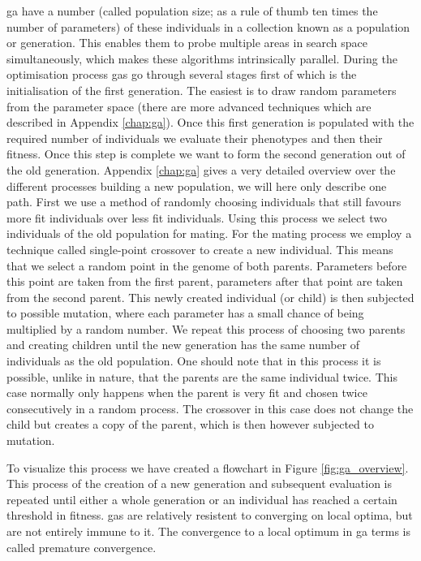 \gls{ga} have a number (called population size; as a rule of thumb ten times the number of parameters) of these \glspl{individual} in a collection known as a population or generation. This enables them to probe multiple areas in search space simultaneously, which makes these algorithms intrinsically parallel. During the optimisation process \glspl{ga} go through several stages first of which is the initialisation of the first generation. The easiest is to draw random parameters from the parameter space (there are more advanced techniques which are described in Appendix \ref{chap:ga}). Once this first generation is populated with the required number of \glspl{individual} we evaluate their \glspl{phenotype} and then their \gls{fitness}. Once this step is complete we want to form the second generation out of the old generation. Appendix \ref{chap:ga} gives a very detailed overview over the different processes building a new population, we will here only describe one path. First we use a method of randomly choosing individuals that still favours more fit \glspl{individual} over less fit \glspl{individual}. Using this process we select two \glspl{individual} of the old population for mating. For the mating process we employ a technique called single-point \gls{crossover} to create a new individual. This means that we select a random point in the \gls{genome} of both parents. Parameters before this point are taken from the first parent, parameters after that point are taken from the second parent. This newly created \gls{individual} (or \gls{child}) is then subjected to possible mutation, where each parameter has a small chance of being multiplied by a random number. We repeat this process of choosing two parents and creating children until the new generation has the same number of individuals as the old population. One should note that in this process it is possible, unlike in nature, that the parents are the same individual twice. This case normally only happens when the parent is very fit and chosen twice consecutively in a random process. The \gls{crossover} in this case does not change the child but creates a copy of the parent, which is then however subjected to mutation. 


To visualize this process we have created a flowchart in Figure \ref{fig:ga_overview}. This process of the creation of a new generation and subsequent evaluation is repeated until either a whole generation or an \gls{individual} has reached a certain threshold in \gls{fitness}. \glspl{ga} are relatively resistent to converging on local optima, but are not entirely immune to it. The convergence to a local optimum in \gls{ga} terms is called premature convergence. 

